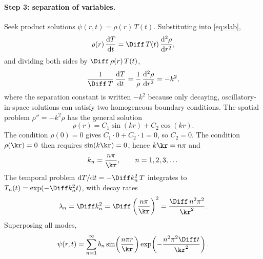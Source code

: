 \paragraph{Step 3: separation of variables.}
Seek product solutions $\psi(r,t) = \rho(r)\,T(t)$. Substituting into
\cref{eq:slab},
%
\begin{equation}
  \rho(r)\,\frac{\mathrm{d}T}{\mathrm{d}t}
  = \Diff\,T(t)\,\frac{\mathrm{d}^{2}\rho}{\mathrm{d}r^{2}} ,
\end{equation}
%
and dividing both sides by $\Diff\,\rho(r)\,T(t)$,
%
\begin{equation}
  \frac{1}{\Diff\,T}\,\frac{\mathrm{d}T}{\mathrm{d}t}
  = \frac{1}{\rho}\,\frac{\mathrm{d}^{2}\rho}{\mathrm{d}r^{2}}
  = -k^{2} ,
\end{equation}
%
where the separation constant is written $-k^{2}$ because only decaying,
oscillatory-in-space solutions can satisfy two homogeneous boundary conditions. The
spatial problem $\rho'' = -k^{2}\rho$ has the general solution
%
\begin{equation}
  \rho(r) = C_{1}\sin(kr) + C_{2}\cos(kr) .
\end{equation}
%
The condition $\rho(0) = 0$ gives $C_{1}\cdot 0 + C_{2}\cdot 1 = 0$, so $C_{2} = 0$.
The condition $\rho(\kr) = 0$ then requires $\sin(k\kr) = 0$, hence
$k\kr = n\pi$ and
%
\begin{equation}
  k_{n} = \frac{n\pi}{\kr} , \qquad n = 1, 2, 3, \dots
\end{equation}
%
The temporal problem $\mathrm{d}T/\mathrm{d}t = -\Diff k_{n}^{2}\,T$ integrates to
$T_{n}(t) = \exp(-\Diff k_{n}^{2} t)$, with decay rates
%
\begin{equation}
  \lambda_{n} = \Diff k_{n}^{2}
  = \Diff \left( \frac{n\pi}{\kr} \right)^{2}
  = \frac{\Diff\, n^{2}\pi^{2}}{\kr^{2}} .
\end{equation}
%
Superposing all modes,
%
\begin{equation}
  \psi(r,t) = \sum_{n=1}^{\infty} b_{n}
  \sin\!\left( \frac{n\pi r}{\kr} \right)
  \exp\!\left( -\frac{n^{2}\pi^{2}\Diff t}{\kr^{2}} \right) .
  \label{eq:series}
\end{equation}

